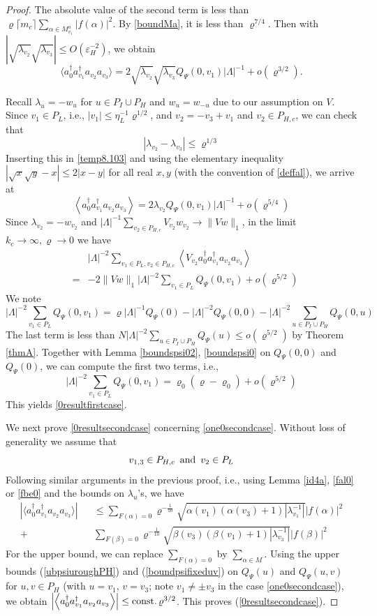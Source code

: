 \documentclass[11pt]{article}
\numberwithin{equation}{section}
\newcommand{\beq}{\begin{equation}}
\newcommand{\eeq}{\end{equation}}
\newcommand{\beqa}{\begin{eqnarray}}
\newcommand{\eeqa}{\end{eqnarray}}
\newcommand\eps{\varepsilon}
\newcommand\rmand{ \,\,\,{\rm and}\,\,\, }
\newcommand\const{{\rm const.\, }}
\newcommand\al{{\alpha}}
\newcommand\be{\beta}
\renewcommand\rho\varrho
\theoremstyle{definition}
\begin{document}
\begin{proof}
The absolute value of the second term is less than $\rho \lceil m_c\rceil \sum_{\al\in M_{v_1}^a}|f(\al)|^2$. By \eqref{boundMa}, it is less than $\rho^{7/4}$. Then  with $|\sqrt{\lambda_{v_2}}\sqrt{\lambda_{v_3}}|\leq O(\eps_H^{-2})$, we obtain 
\beq\label{temp8.103}
\langle  a^\dagger_{0}a^\dagger_{v_1}a_{v_2}a_{v_3}\rangle= 2 \sqrt{\lambda_{v_2}}\sqrt{\lambda_{v_3}}Q_{\Psi}(0,v_1)|\Lambda|^{-1}+o(\rho^{3/2}).
\eeq


Recall $\lambda_{u} = - w_{u}$ for $u \in P_{I}\cup P_{H}$ and $w_{u}= w_{-u}$ due to our assumption on $V$. 
Since  $v_{1} \in P_{L}$, i.e., $|v_1|\leq\eta_L^{-1}\rho^{1/2}$, and $v_{2}= -v_{3} + v_{1}$ and $v_{2} \in P_{H, c}$, we can check 
that 
\beq
\left|\lambda_{v_2}-\lambda_{v_3}\right|\leq \rho^{1/3}
\eeq
Inserting this in \eqref{temp8.103} and using the elementary inequality $|\sqrt{x}\sqrt{y}-x|\leq 2|x-y|$ for all real $x,y$ (with the convention of \eqref{deffal}), we arrive at 
\beq
\left\langle a^\dagger_0a^\dagger_{v_1}a_{v_2}a_{v_3}\right\rangle= 2 \lambda_{v_2}Q_\Psi(0,v_1)|\Lambda|^{-1}+o(\rho^{5/4})
\eeq
Since $\lambda_{v_2}=-w_{v_2}$ and $|\Lambda|^{-1}\sum_{v_2\in P_{H,c}}V_{v_2}w_{v_2}\to\|Vw\|_1$, in the limit $k_c\to\infty,\rho\to 0$ we have
\beqa\nonumber
&&|\Lambda|^{-2}\sum_{v_1\in P_L, v_2\in P_{H,c}}\left\langle V_{v_2} a^\dagger_0a^\dagger_{v_1}a_{v_2}a_{v_3}\right\rangle\\
&=&-2\|Vw\|_1 |\Lambda|^{-2} \sum_{v_1\in P_L}Q_\Psi(0,v_1)+o(\rho^{5/2})
\eeqa
We note
\beq
|\Lambda|^{-2} \sum_{v_1\in P_L}Q_\Psi(0,v_1)=\rho |\Lambda|^{-1}Q_\Psi(0)- |\Lambda|^{-2}Q_\Psi(0,0)-
|\Lambda|^{-2} \sum_{u\in P_I\cup P_H}Q_\Psi(0,u)
\eeq
The last term is less than $N|\Lambda|^{-2} \sum_{u\in P_I\cup P_H}Q_\Psi(u)\le o(\rho^{5/2})$ by Theorem \ref{thmA}.  Together with Lemma \ref{boundspsi02}, \ref{boundspsi0} on $Q_\Psi(0,0)$ and $Q_\Psi(0)$, we can compute the first two terms, i.e.,
\beq\label{sum0PL}
|\Lambda|^{-2} \sum_{v_1\in P_L}Q_\Psi(0,v_1)=\rho_0(\rho-\rho_0)+o(\rho^{5/2})
\eeq
This yields  \eqref{0resultfirstcase}.


We next prove \eqref{0resultsecondcase} concerning  \eqref{one0secondcase}. Without loss of generality we assume  that 
\beq
v_{1,3}\in  P_{H,c}\rmand v_2\in P_L
\eeq
Following similar arguments  in the previous proof, i.e.,  using  Lemma \ref{id4a}, \eqref{fal0} or  \eqref{fbe0} and the bounds on $\lambda_u$'s, we have
\beqa
|\langle a^\dagger_0a^\dagger_{v_1}a_{v_2}a_{v_3}\rangle|&&\leq \sum_{F(\al)=0}\rho^{-\frac{1}{10}} \sqrt{\al(v_1)(\al(v_3)+1)\left|\lambda_{v_1}^{-1}\right|}|f(\al)|^2\\\nonumber
+&&\sum_{F(\be)=0}\rho^{-\frac{1}{10}} \sqrt{\be(v_3)(\be(v_1)+1)\left|\lambda_{v_3}^{-1}\right|}|f(\be)|^2
\eeqa
For the upper bound, we can replace $\sum_{F(\al)=0}$ by  $\sum_{\al \in M}$. Using the upper bounds (\ref{ubpsiuroughPH}) and  (\ref{boundpsifixeduv}) on $Q_\Psi(u)$ and  $Q_\Psi(u,v)$  for $u,v\in P_H$ (with $u=v_1$, $v=v_3$; note $v_1\neq\pm v_3$ in the case \eqref{one0secondcase}), we obtain 
$
\left|\left\langle a^\dagger_0a^\dagger_{v_1}a_{v_2}a_{v_3}\right\rangle\right| \leq \const\rho^{3/2}
$. 
This proves  (\ref{0resultsecondcase}).


\end{proof}
\end{document}
